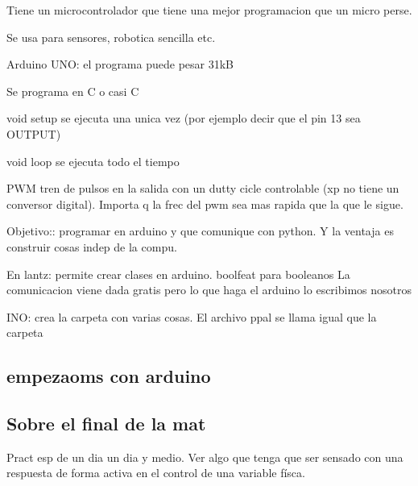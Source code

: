 \documentclass[a4paper,12pt]{article}
\begin{document}
Tiene un microcontrolador que tiene una mejor programacion que un micro perse. 

Se usa para sensores, robotica sencilla etc. 

Arduino UNO: 
el programa puede pesar 31kB

Se programa en C o casi C

void setup se ejecuta una unica vez (por ejemplo decir que el pin 13 sea OUTPUT)

void loop se ejecuta todo el tiempo


PWM tren de pulsos en la salida con un dutty cicle controlable (xp no tiene un conversor digital). Importa q la frec del pwm sea mas rapida que la que le sigue. 



Objetivo:: programar en arduino y que comunique con python. Y la ventaja es construir cosas indep de la compu. 


En lantz: permite crear clases en arduino. 
boolfeat para booleanos
La comunicacion viene dada gratis pero lo que haga el arduino lo escribimos nosotros 

INO: crea la carpeta con varias cosas. El archivo ppal se llama igual que la carpeta

\subsection{empezaoms con arduino }




\subsection{Sobre el final de la mat}
Pract esp de un dia un dia y medio. Ver algo que tenga que ser sensado con una respuesta de forma activa en el control de una variable físca. 
\end{document}
